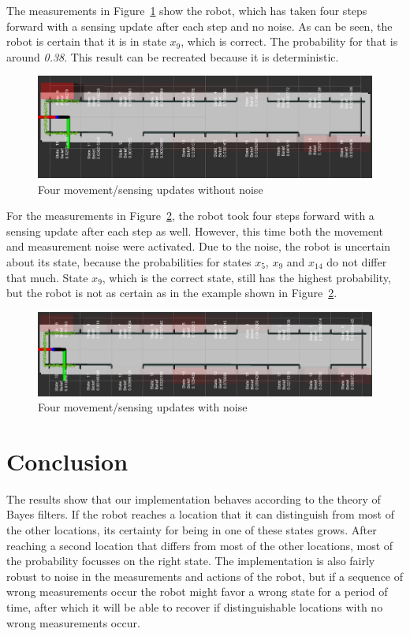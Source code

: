 \documentclass[10pt,a4paper]{article}
\begin{document}
	The measurements in Figure~\ref{fig:4stepsNoNoise} show the robot, which has taken four steps forward with a sensing update after each step and no noise. As can be seen, the robot is certain that it is in state \textit{$x_9$}, which is correct. The probability for that is around \textit{0.38}. This result can be recreated because it is deterministic.
	
	\begin{figure}[h]
		\centering
		\includegraphics[scale=0.9]{data/4stepsforward.png}
		\caption{Four movement/sensing updates without noise}
		\label{fig:4stepsNoNoise}
	\end{figure}
	
	For the measurements in Figure~\ref{fig:4stepsNoise}, the robot took four steps forward with a sensing update after each step as well. However, this time both the movement and measurement noise were activated. Due to the noise, the robot is uncertain about its state, because the probabilities for states \textit{$x_5$}, \textit{$x_9$} and \textit{$x_{14}$} do not differ that much. State \textit{$x_9$}, which is the correct state, still has the highest probability, but the robot is not as certain as in the example shown in Figure~\ref{fig:4stepsNoise}.
	
	\begin{figure}[h]
		\centering
		\includegraphics[scale=0.9]{data/4stepsforwardNoise.png}
		\caption{Four movement/sensing updates with noise}
		\label{fig:4stepsNoise}
	\end{figure}
	
	\section{Conclusion}
	The results show that our implementation behaves according to the theory of Bayes filters. If the robot reaches a location that it can distinguish from most of the other locations, its certainty for being in one of these states grows. After reaching a second location that differs from most of the other locations, most of the probability focusses on the right state. The implementation is also fairly robust to noise in the measurements and actions of the robot, but if a sequence of wrong measurements occur the robot might favor a wrong state for a period of time, after which it will be able to recover if distinguishable locations with no wrong measurements occur.
	
\end{document}
